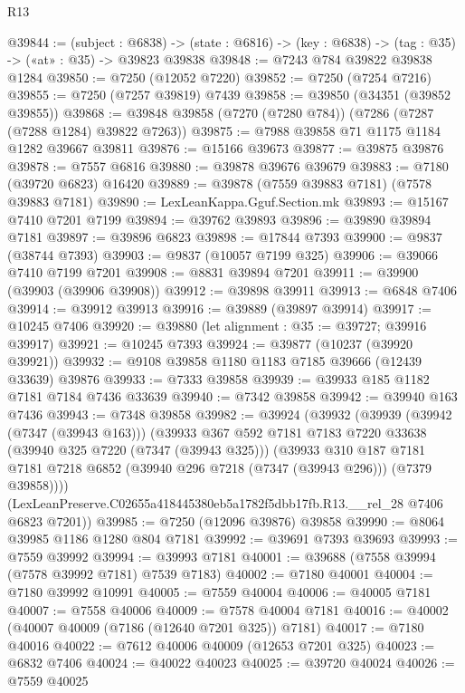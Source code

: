 \begin{lexlean}{R13}
\begin{coremodule}
@39844 := (subject : @6838) ->
  (state : @6816) -> (key : @6838) -> (tag : @35) -> («at» : @35) -> @39823 @39838
@39848 := @7243 @784 @39822 @39838 @1284
@39850 := @7250 (@12052 @7220)
@39852 := @7250 (@7254 @7216)
@39855 := @7250 (@7257 @39819) @7439
@39858 := @39850 (@34351 (@39852 @39855))
@39868 := @39848 @39858 (@7270 (@7280 @784)) (@7286 (@7287 (@7288 @1284) @39822 @7263))
@39875 := @7988 @39858 @71 @1175 @1184 @1282 @39667 @39811
@39876 := @15166 @39673
@39877 := @39875 @39876
@39878 := @7557 @6816
@39880 := @39878 @39676 @39679
@39883 := @7180 (@39720 @6823) @16420
@39889 := @39878 (@7559 @39883 @7181) (@7578 @39883 @7181)
@39890 := LexLeanKappa.Gguf.Section.mk
@39893 := @15167 @7410 @7201 @7199
@39894 := @39762 @39893
@39896 := @39890 @39894 @7181
@39897 := @39896 @6823
@39898 := @17844 @7393
@39900 := @9837 (@38744 @7393)
@39903 := @9837 (@10057 @7199 @325)
@39906 := @39066 @7410 @7199 @7201
@39908 := @8831 @39894 @7201
@39911 := @39900 (@39903 (@39906 @39908))
@39912 := @39898 @39911
@39913 := @6848 @7406
@39914 := @39912 @39913
@39916 := @39889 (@39897 @39914)
@39917 := @10245 @7406
@39920 := @39880 (let alignment : @35 := @39727; @39916 @39917)
@39921 := @10245 @7393
@39924 := @39877 (@10237 (@39920 @39921))
@39932 := @9108 @39858 @1180 @1183 @7185 @39666 (@12439 @33639) @39876
@39933 := @7333 @39858
@39939 := @39933 @185 @1182 @7181 @7184 @7436 @33639
@39940 := @7342 @39858
@39942 := @39940 @163 @7436
@39943 := @7348 @39858
@39982 := @39924
    (@39932
      (@39939
        (@39942 (@7347 (@39943 @163)))
        (@39933
          @367
          @592
          @7181
          @7183
          @7220
          @33638
          (@39940 @325 @7220 (@7347 (@39943 @325)))
          (@39933
            @310
            @187
            @7181
            @7181
            @7218
            @6852
            (@39940 @296 @7218 (@7347 (@39943 @296)))
            (@7379 @39858))))
      (LexLeanPreserve.C02655a418445380eb5a1782f5dbb17fb.R13.__rel_28 @7406 @6823 @7201))
@39985 := @7250 (@12096 @39876) @39858
@39990 := @8064 @39985 @1186 @1280 @804 @7181
@39992 := @39691 @7393 @39693
@39993 := @7559 @39992
@39994 := @39993 @7181
@40001 := @39688 (@7558 @39994 (@7578 @39992 @7181) @7539 @7183)
@40002 := @7180 @40001
@40004 := @7180 @39992 @10991
@40005 := @7559 @40004
@40006 := @40005 @7181
@40007 := @7558 @40006
@40009 := @7578 @40004 @7181
@40016 := @40002 (@40007 @40009 (@7186 (@12640 @7201 @325)) @7181)
@40017 := @7180 @40016
@40022 := @7612 @40006 @40009 (@12653 @7201 @325)
@40023 := @6832 @7406
@40024 := @40022 @40023
@40025 := @39720 @40024
@40026 := @7559 @40025

\end{coremodule}
\end{lexlean}
